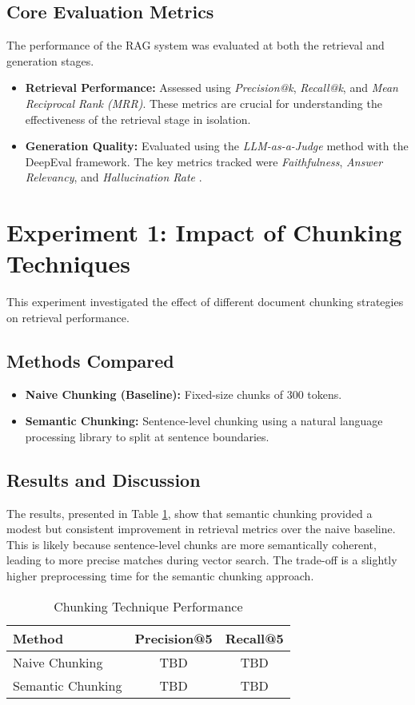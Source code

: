 \subsection{Core Evaluation Metrics}
The performance of the RAG system was evaluated at both the retrieval and generation stages.
\begin{itemize}
\item \textbf{Retrieval Performance:} Assessed using \textit{Precision@k}, \textit{Recall@k}, and \textit{Mean Reciprocal Rank (MRR)}. These metrics are crucial for understanding the effectiveness of the retrieval stage in isolation.
\item \textbf{Generation Quality:} Evaluated using the \textit{LLM-as-a-Judge} method with the DeepEval framework. The key metrics tracked were \textit{Faithfulness}, \textit{Answer Relevancy}, and \textit{Hallucination Rate} \autocite{zheng2023judging}.
\end{itemize}

\section{Experiment 1: Impact of Chunking Techniques}
\label{sec:exp_chunking}
This experiment investigated the effect of different document chunking strategies on retrieval performance.
\subsection{Methods Compared}
\begin{itemize}
    \item \textbf{Naive Chunking (Baseline):} Fixed-size chunks of 300 tokens.
    \item \textbf{Semantic Chunking:} Sentence-level chunking using a natural language processing library to split at sentence boundaries.
\end{itemize}
\subsection{Results and Discussion}
The results, presented in Table \ref{tab:chunking_results}, show that semantic chunking provided a modest but consistent improvement in retrieval metrics over the naive baseline. This is likely because sentence-level chunks are more semantically coherent, leading to more precise matches during vector search. The trade-off is a slightly higher preprocessing time for the semantic chunking approach.

\begin{table}[!htbp]
\centering
\caption{Chunking Technique Performance}
\label{tab:chunking_results}
\begin{tabular}{|l|c|c|}
\hline
\textbf{Method} & \textbf{Precision@5} & \textbf{Recall@5} \\
\hline
Naive Chunking & TBD & TBD \\
Semantic Chunking & TBD & TBD \\
\hline
\end{tabular}
\end{table}


